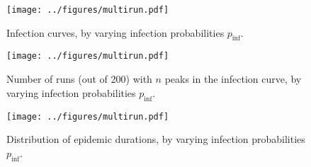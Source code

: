 \documentclass[11pt]{article}
\begin{document}
    \begin{figure}[h!]
    \begin{center}
        \texttt{[image: ../figures/multirun.pdf]}
    \end{center}
    \caption{Infection curves, by varying infection probabilities
    $p_\text{inf}$.}
    \label{fig:multiruns}
    \end{figure}


    \begin{figure}[h!]
    \begin{center}
        \texttt{[image: ../figures/multirun.pdf]}
    \end{center}
    \caption{Number of runs (out of 200) with $n$ peaks in the infection
    curve, by varying infection probabilities $p_\text{inf}$.}
    \label{fig:peaks}
    \end{figure}

    \begin{figure}[h!]
    \begin{center}
        \texttt{[image: ../figures/multirun.pdf]}
    \end{center}
    \caption{Distribution of epidemic durations, by varying infection
    probabilities $p_\text{inf}$.}
    \label{fig:durations}
    \end{figure}
\end{document}
